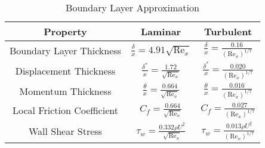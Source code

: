 \begin{table}[H]
    \caption{Boundary Layer Approximation}
    \label{tab:boundary_layer_approximation}
    \centering
    \begin{tabular}{ccc}
        \hline
        Property & Laminar & Turbulent \\
        \hline
        Boundary Layer Thickness & $\frac{\delta}{x} = 4.91 \sqrt{\text{Re}_x}$ & $\frac{\delta}{x} = \frac{0.16}{(\text{Re}_x)^{1/7}}$ \\
        Displacement Thickness & $\frac{\delta^*}{x} = \frac{1.72}{\sqrt{\text{Re}_x}}$ & $\frac{\delta^*}{x} = \frac{0.020}{(\text{Re}_x)^{1/7}}$ \\
        Momentum Thickness & $\frac{\theta}{x} = \frac{0.664}{\sqrt{\text{Re}_x}}$ & $\frac{\theta}{x} = \frac{0.016}{(\text{Re}_x)^{1/7}}$ \\   
        Local Friction Coefficient & $C_f = \frac{0.664}{\sqrt{\text{Re}_x}}$ & $C_f = \frac{0.027}{(\text{Re}_x)^{1/7}}$ \\
        Wall Shear Stress & $\tau_w = \frac{0.332 \rho U^2}{\sqrt{\text{Re}_x}}$ & $\tau_w = \frac{0.013 \rho U^2}{(\text{Re}_x)^{1/7}}$ \\
        \hline
    \end{tabular}
\end{table}